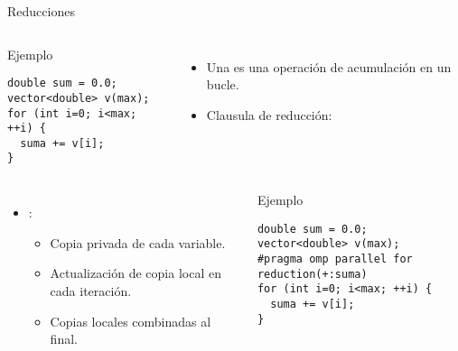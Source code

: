 \begin{frame}[t,fragile,shrink=10]{Reducciones}
\begin{columns}


\begin{block}{Ejemplo}
\begin{lstlisting}
double sum = 0.0; 
vector<double> v(max);
for (int i=0; i<max; ++i) {
  suma += v[i];
}
\end{lstlisting}
\end{block}

\begin{itemize}
  \item Una  es una operación de acumulación
        en un bucle.
  \pause
  \item Clausula de reducción: 
\end{itemize}

\end{columns}


\begin{columns}


\pause

\begin{itemize}
  \item {}:
    \begin{itemize}
      \item Copia privada de cada variable.
      \item Actualización de copia local en cada iteración.
      \item Copias locales combinadas al final.
    \end{itemize}
\end{itemize}


\pause
\begin{block}{Ejemplo}
\begin{lstlisting}
double sum = 0.0; 
vector<double> v(max);
#pragma omp parallel for reduction(+:suma)
for (int i=0; i<max; ++i) {
  suma += v[i];
}
\end{lstlisting}
\end{block}

\end{columns}

\end{frame}

